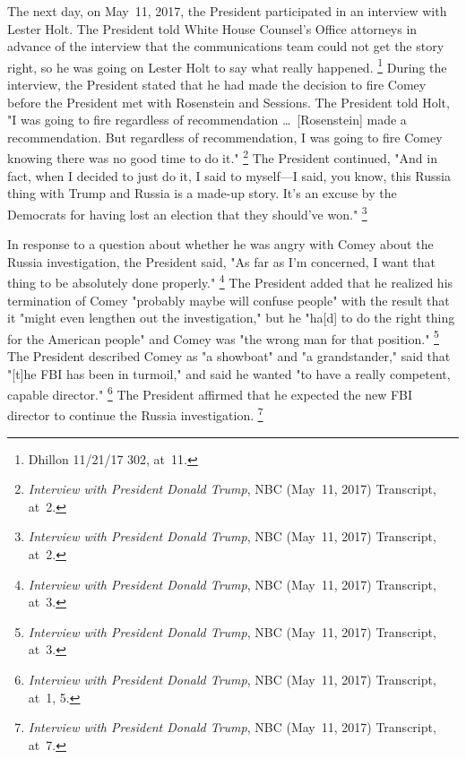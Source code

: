 The next day, on May~11, 2017, the President participated in an interview with Lester Holt.
The President told White House Counsel's Office attorneys in advance of the interview that the communications team could not get the story right, so he was going on Lester Holt to say what really happened.%
\footnote{Dhillon 11/21/17 302, at~11.}
During the interview, the President stated that he had made the decision to fire Comey before the President met with Rosenstein and Sessions.
The President told Holt, "I was going to fire regardless of recommendation \dots\ [Rosenstein] made a recommendation.
But regardless of recommendation, I was going to fire Comey knowing there was no good time to do it."%
\footnote{\textit{Interview with President Donald Trump}, NBC (May~11, 2017) Transcript, at~2.}
The President continued, "And in fact, when I decided to just do it, I said to myself---I said, you know, this Russia thing with Trump and Russia is a made-up story.
It's an excuse by the Democrats for having lost an election that they should've won."%
\footnote{\textit{Interview with President Donald Trump}, NBC (May~11, 2017) Transcript, at~2.}

In response to a question about whether he was angry with Comey about the Russia investigation, the President said, "As far as I'm concerned, I want that thing to be absolutely done properly."%
\footnote{\textit{Interview with President Donald Trump}, NBC (May~11, 2017) Transcript, at~3.}
The President added that he realized his termination of Comey "probably maybe will confuse people" with the result that it "might even lengthen out the investigation," but he "ha[d] to do the right thing for the American people" and Comey was "the wrong man for that position."%
\footnote{\textit{Interview with President Donald Trump}, NBC (May~11, 2017) Transcript, at~3.}
The President described Comey as "a showboat" and "a grandstander," said that "[t]he FBI has been in turmoil," and said he wanted "to have a really competent, capable director."%
\footnote{\textit{Interview with President Donald Trump}, NBC (May~11, 2017) Transcript, at~1, 5.}
The President affirmed that he expected the new FBI director to continue the Russia investigation.%
\footnote{\textit{Interview with President Donald Trump}, NBC (May~11, 2017) Transcript, at~7.}

